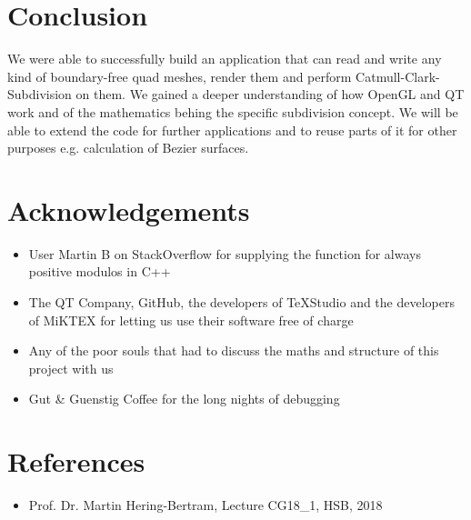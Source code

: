 \documentclass[12pt,a4paper]{scrartcl}
\begin{document}
\section{Conclusion}
We were able to successfully build an application that can read and write any kind of boundary-free quad meshes, render them and perform Catmull-Clark-Subdivision on them. We gained a deeper understanding of how OpenGL and QT work and of the mathematics behing the specific subdivision concept. We will be able to extend the code for further applications and to reuse parts of it for other purposes e.g. calculation of Bezier surfaces.

\section{Acknowledgements}
\begin{itemize}
	\item User Martin B on StackOverflow for supplying the function for always positive modulos in C++
	\item The QT Company, GitHub, the developers of TeXStudio and the developers of MiKTEX for letting us use their software free of charge
	\item Any of the poor souls that had to discuss the maths and structure of this project with us
	\item Gut \& Guenstig Coffee for the long nights of debugging
\end{itemize}

\section{References}
\begin{itemize}
	\item Prof. Dr. Martin Hering-Bertram, Lecture CG18_1, HSB, 2018
\end{itemize}
\end{document}
